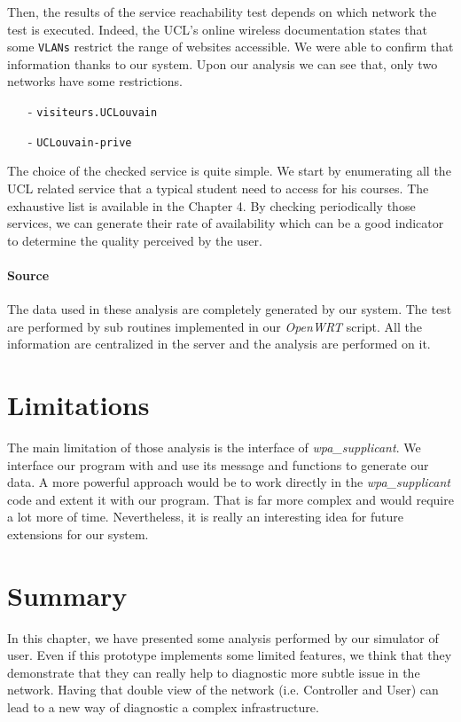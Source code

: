  Then, the results of the service reachability test depends on which network the test is executed. Indeed, the UCL's online wireless documentation states that some \texttt{VLANs} restrict the range of websites accessible. We were able to confirm that information thanks to our system. Upon our analysis we can see that, only two networks have some restrictions.
\begin{itemize}
	\item [-] \texttt{visiteurs.UCLouvain}
	\item [-] \texttt{UCLouvain-prive}
\end{itemize}
The choice of the checked service is quite simple. We start by enumerating all the UCL related service that a typical student need to access for his courses. The exhaustive list is available in the Chapter 4. By checking periodically those services, we can generate their rate of availability which can be a good indicator to determine the quality perceived by the user.

\paragraph*{Source} The data used in these analysis are completely generated by our system. The test are performed by sub routines implemented in our \emph{OpenWRT} script. All the information are centralized in the server and the analysis are performed on it.


\section{Limitations}
The main limitation of those analysis is the interface of \emph{wpa_supplicant}. We interface our program with and use its message and functions to generate our data. A more powerful approach would be to work directly in the \emph{wpa_supplicant} code and extent it with our program. That is far more complex and would require a lot more of time. Nevertheless, it is really an interesting idea for future extensions for our system.

\section{Summary}
In this chapter, we have presented some analysis performed by our simulator of user. Even if this prototype implements some limited features, we think that they demonstrate that they can really help to diagnostic more subtle issue in the network. Having that double view of the network (i.e. Controller and User) can lead to a new way of diagnostic a complex infrastructure.

